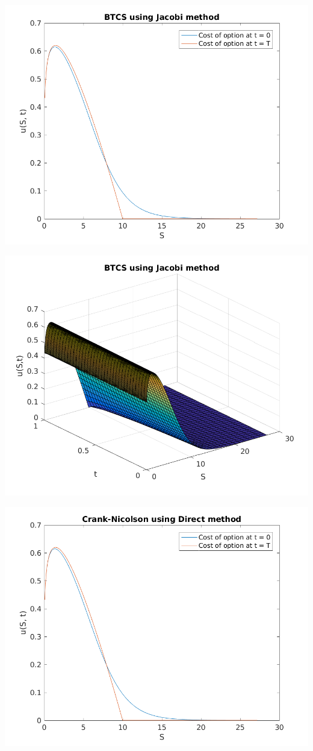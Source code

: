 \documentclass{article}
\begin{document}
\includegraphics{"q2_7"}
\pagebreak


\includegraphics{"q2_8"}
\pagebreak


\includegraphics{"q2_9"}
\pagebreak
\end{document}
